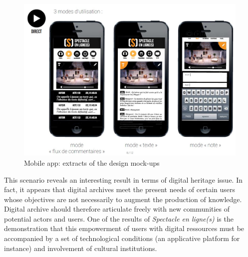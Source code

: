 \documentclass[conference]{IEEEtran}
\newcommand{\todo}[1]{\noindent\textcolor{red}{{\bf \{ToDo} #1{\bf \}}}}
\begin{document}
\begin{figure}[htb!]
  \centering
  \includegraphics[width=\columnwidth]{mobileapp}
  \caption{Mobile app: extracts of the design mock-ups}
  \label{fig:mobileapp}
\end{figure}


This scenario reveals an interesting result in terms of digital heritage issue. In fact, it appears that digital archives meet the present needs of certain users whose objectives are not necessarily to augment the production of knowledge. Digital archive should therefore articulate freely with new communities of potential actors and users. One of the results of \emph{Spectacle en ligne(s)} is the demonstration that this empowerment of users with digital ressources must be accompanied by a set of technological conditions (an applicative platform for instance) and involvement of cultural institutions. 

\end{document}
